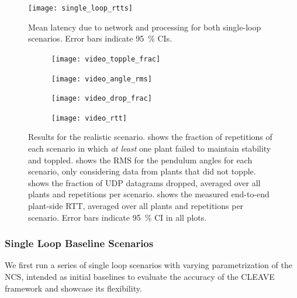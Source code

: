 \begin{figure}
    \centering
    \texttt{[image: single\_loop\_rtts]}
    \caption{
        Mean latency due to network and processing for both single-loop scenarios.
        Error bars indicate \SI{95}{\percent} \acp{CI}.
    }\label{fig:single:rtt}
\end{figure}

\begin{figure}[t]
    \centering
    \begin{subfigure}[h]{.25\textwidth}
        \centering
        \texttt{[image: video\_topple\_frac]}
        \caption{}\label{fig:video:toppled}
    \end{subfigure}%
    \begin{subfigure}[h]{.25\textwidth}
        \centering
        \texttt{[image: video\_angle\_rms]}
        \caption{}\label{fig:video:rms}
    \end{subfigure}%
    \begin{subfigure}[h]{.25\textwidth}
        \centering
        \texttt{[image: video\_drop\_frac]}
        \caption{}\label{fig:video:drop}
    \end{subfigure}%
    \begin{subfigure}[h]{.25\textwidth}
        \centering
        \texttt{[image: video\_rtt]}
        \caption{}\label{fig:video:rtt}
    \end{subfigure}%
    \caption{
        Results for the realistic scenario.
         shows the fraction of repetitions of each scenario in which \emph{at least} one plant failed to maintain stability and toppled.
         shows the \ac{RMS} for the pendulum angles for each scenario, only considering data from plants that did not topple.
         shows the fraction of \ac{UDP} datagrams dropped, averaged over all plants and repetitions per scenario.
         shows the measured end-to-end plant-side \ac{RTT}, averaged over all plants and repetitions per scenario.
        Error bars indicate \SI{95}{\percent} \ac{CI} in all plots.
    }\label{fig:video:results}
\end{figure}

\subsubsection{Single Loop Baseline Scenarios}

We first run a series of single loop scenarios with varying parametrization of the \ac{NCS}, intended as initial baselines to evaluate the accuracy of the \ac{CLEAVE} framework and showcase its flexibility.

